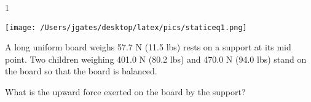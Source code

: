 
\AddToShipoutPicture*{\BackgroundPic}

\addtocounter {ProbNum} {1}

\begin{floatingfigure}[r]{.35\textwidth}
\texttt{[image: /Users/jgates/desktop/latex/pics/staticeq1.png]}
\end{floatingfigure}
 
{\bf \Large{}} A long uniform board weighs 57.7 N (11.5 lbs) rests on a support at its mid point. Two children weighing 401.0 N (80.2 lbs) and 470.0 N (94.0 lbs) stand on the board so that the board is balanced. 

\bigskip
What is the upward force exerted on the board by the support? 



\vfill
\newpage